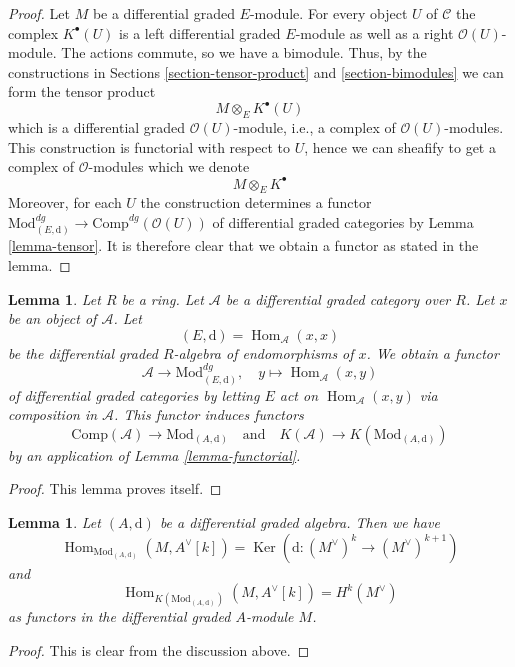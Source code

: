 \documentclass{stacks-project}
\theoremstyle{plain}
\newtheorem{lemma}[subsection]{Lemma}
\theoremstyle{definition}
\theoremstyle{remark}
\numberwithin{equation}{subsection}
\def\Hom{\mathop{\mathrm{Hom}}\nolimits}
\def\Ker{\mathop{\mathrm{Ker}}}
\begin{document}
\begin{proof}
Let $M$ be a differential graded $E$-module. For every object $U$ of
$\mathcal{C}$ the complex $K^\bullet(U)$ is a left differential
graded $E$-module as well as a right $\mathcal{O}(U)$-module.
The actions commute, so we have a bimodule.
Thus, by the constructions in
Sections \ref{section-tensor-product} and \ref{section-bimodules}
we can form the tensor product
$$
M \otimes_E K^\bullet(U)
$$
which is a differential graded $\mathcal{O}(U)$-module, i.e., a complex
of $\mathcal{O}(U)$-modules. This construction is functorial with respect
to $U$, hence we can sheafify to get a complex of $\mathcal{O}$-modules
which we denote
$$
M \otimes_E K^\bullet
$$
Moreover, for each $U$ the construction determines a functor
$\text{Mod}^{dg}_{(E, \text{d})} \to \text{Comp}^{dg}(\mathcal{O}(U))$
of differential graded categories by Lemma \ref{lemma-tensor}.
It is therefore clear that we obtain a functor as stated in the lemma.
\end{proof}

\begin{lemma}
\label{lemma-construction}
Let $R$ be a ring. Let $\mathcal{A}$ be a differential graded category
over $R$. Let $x$ be an object of $\mathcal{A}$. Let
$$
(E, \text{d}) = \Hom_\mathcal{A}(x, x)
$$
be the differential graded $R$-algebra of endomorphisms of $x$.
We obtain a functor
$$
\mathcal{A} \longrightarrow \text{Mod}^{dg}_{(E, \text{d})},\quad
y \longmapsto \Hom_\mathcal{A}(x, y)
$$
of differential graded categories by letting $E$ act on
$\Hom_\mathcal{A}(x, y)$ via composition in $\mathcal{A}$.
This functor induces functors
$$
\text{Comp}(\mathcal{A}) \to \text{Mod}_{(A, \text{d})}
\quad\text{and}\quad
K(\mathcal{A}) \to K(\text{Mod}_{(A, \text{d})})
$$
by an application of Lemma \ref{lemma-functorial}.
\end{lemma}

\begin{proof}
This lemma proves itself.
\end{proof}

\begin{lemma}
\label{lemma-hom-into-shift-dual-free}
Let $(A, \text{d})$ be a differential graded algebra. Then we have
$$
\Hom_{\text{Mod}_{(A, \text{d})}}(M, A^\vee[k]) =
\Ker(\text{d} : (M^\vee)^k \to (M^\vee)^{k + 1})
$$
and
$$
\Hom_{K(\text{Mod}_{(A, \text{d})})}(M, A^\vee[k]) = H^k(M^\vee)
$$
as functors in the differential graded $A$-module $M$.
\end{lemma}

\begin{proof}
This is clear from the discussion above.
\end{proof}
\end{document}
